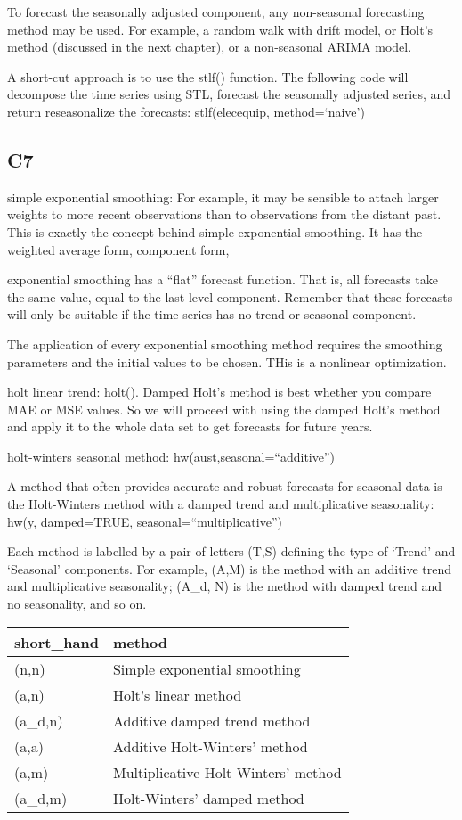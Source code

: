 \documentclass[]{book}
\begin{document}
To forecast the seasonally adjusted component, any non-seasonal
forecasting method may be used. For example, a random walk with drift
model, or Holt's method (discussed in the next chapter), or a
non-seasonal ARIMA model.

A short-cut approach is to use the stlf() function. The following code
will decompose the time series using STL, forecast the seasonally
adjusted series, and return reseasonalize the forecasts: stlf(elecequip,
method=`naive')

\subsection{C7}\label{c7}

simple exponential smoothing: For example, it may be sensible to attach
larger weights to more recent observations than to observations from the
distant past. This is exactly the concept behind simple exponential
smoothing. It has the weighted average form, component form,

exponential smoothing has a ``flat'' forecast function. That is, all
forecasts take the same value, equal to the last level component.
Remember that these forecasts will only be suitable if the time series
has no trend or seasonal component.

The application of every exponential smoothing method requires the
smoothing parameters and the initial values to be chosen. THis is a
nonlinear optimization.

holt linear trend: holt(). Damped Holt's method is best whether you
compare MAE or MSE values. So we will proceed with using the damped
Holt's method and apply it to the whole data set to get forecasts for
future years.

holt-winters seasonal method: hw(aust,seasonal=``additive'')

A method that often provides accurate and robust forecasts for seasonal
data is the Holt-Winters method with a damped trend and multiplicative
seasonality: hw(y, damped=TRUE, seasonal=``multiplicative'')

Each method is labelled by a pair of letters (T,S) defining the type of
`Trend' and `Seasonal' components. For example, (A,M) is the method with
an additive trend and multiplicative seasonality; (A\_d, N) is the
method with damped trend and no seasonality, and so on.

\begin{longtable}[]{@{}ll@{}}
\toprule
short\_hand & method\tabularnewline
\midrule
\endhead
(n,n) & Simple exponential smoothing\tabularnewline
(a,n) & Holt's linear method\tabularnewline
(a\_d,n) & Additive damped trend method\tabularnewline
(a,a) & Additive Holt-Winters' method\tabularnewline
(a,m) & Multiplicative Holt-Winters' method\tabularnewline
(a\_d,m) & Holt-Winters' damped method\tabularnewline
\bottomrule
\end{longtable}
\end{document}
